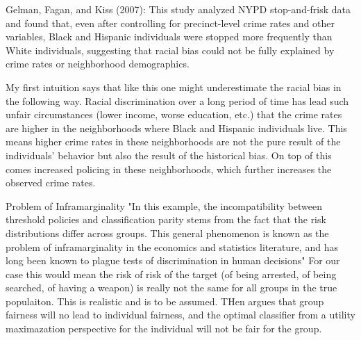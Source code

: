 Gelman, Fagan, and Kiss (2007): This study analyzed NYPD stop-and-frisk data and found that,
even after controlling for precinct-level crime rates and other variables, Black and Hispanic
individuals were stopped more frequently than White individuals, suggesting that racial bias
could not be fully explained by crime rates or neighborhood demographics.

My first intuition says that like this one might underestimate the racial bias in the following way.
Racial discrimination over a long period of time has lead such unfair circumstances
(lower income, worse education, etc.) that the crime rates are higher in the neighborhoods
where Black and Hispanic individuals live. This means higher crime rates in these neighborhoods
are not the pure result of the individuals' behavior but also the result of the historical bias.
On top of this comes increased policing in these neighborhoods, which further increases the observed
crime rates. 




Problem of Inframarginality \cite{corbett-davies}
"In this example, the incompatibility between threshold policies and classification parity stems from the fact that
the risk distributions differ across groups. This general phenomenon is known as the problem of inframarginality in
the economics and statistics literature, and has long been known to plague tests of discrimination in human decisions"
For our case this would mean the risk of risk of the target (of being arrested, of being searched, of having a weapon)
is really not the same for all groups in the true populaiton. This is realistic and is to be assumed. THen \cite{corbett-davies}
argues that group fairness will no lead to individual fairness, and the optimal classifier from a utility maximazation perspective
for the individual will not be fair for the group.

